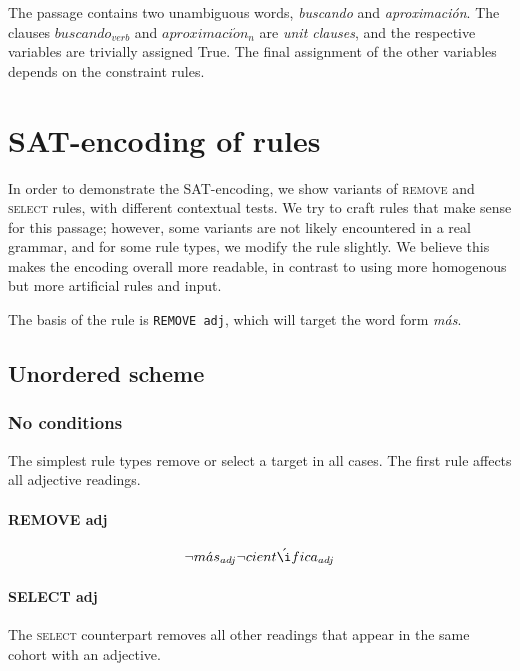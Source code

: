 The passage contains two unambiguous words, \emph{buscando} and \emph{aproximación}. The clauses $buscando_{verb}$ and $aproximaci\acute{o}n_n$ are \emph{unit clauses}, and the respective variables are trivially assigned True. 
The final assignment of the other variables depends on the constraint rules.

\section{SAT-encoding of rules}

In order to demonstrate the SAT-encoding, we show variants of \textsc{remove} and \textsc{select} rules, with different contextual tests. 
We try to craft rules that make sense for this passage; however, some variants are not likely encountered in a real grammar, and for some rule types, we modify the rule slightly. We believe this makes the encoding overall more readable, in contrast to using more homogenous but more artificial rules and input.

The basis of the rule is \texttt{REMOVE adj}, which will target the word form \emph{más}.

\subsection{Unordered scheme}



\subsubsection{No conditions} 

The simplest rule types remove or select a target in all cases. 
The first rule affects all adjective readings.
\paragraph{REMOVE adj}

\begin{multline}
\neg{}m\acute{a}s_{adj} 
\neg{}cient\acute{\i}fica_{adj}
\end{multline}

\paragraph{SELECT adj}
The \textsc{select} counterpart removes all other readings that appear in the same cohort with an adjective.

